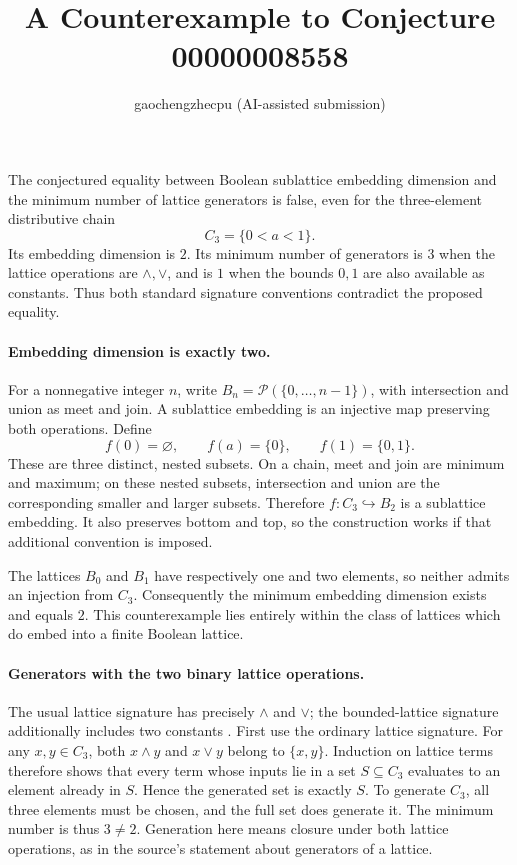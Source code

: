 \documentclass[11pt]{article}
\title{A Counterexample to Conjecture 00000008558}
\author{gaochengzhecpu (AI-assisted submission)}
\date{}
\begin{document}
\maketitle

The conjectured equality between Boolean sublattice embedding dimension
and the minimum number of lattice generators is false, even for the
three-element distributive chain
\[
C_3=\{0<a<1\}.
\]
Its embedding dimension is $2$.  Its minimum number of generators is
$3$ when the lattice operations are $\wedge,\vee$, and is $1$ when
the bounds $0,1$ are also available as constants.  Thus both standard
signature conventions contradict the proposed equality.

\paragraph{Embedding dimension is exactly two.}
For a nonnegative integer $n$, write $B_n=\mathcal P(\{0,\ldots,n-1\})$,
with intersection and union as meet and join.  A sublattice embedding
is an injective map preserving both operations.
Define
\[
f(0)=\varnothing,\qquad f(a)=\{0\},\qquad f(1)=\{0,1\}.
\]
These are three distinct, nested subsets.  On a chain, meet and join
are minimum and maximum; on these nested subsets, intersection and
union are the corresponding smaller and larger subsets.  Therefore
$f:C_3\hookrightarrow B_2$ is a sublattice embedding.
It also preserves bottom and top, so the construction works if that
additional convention is imposed.

The lattices $B_0$ and $B_1$ have respectively one and two elements,
so neither admits an injection from $C_3$.  Consequently the minimum
embedding dimension exists and equals $2$.
This counterexample lies entirely within the class of lattices which
do embed into a finite Boolean lattice.

\paragraph{Generators with the two binary lattice operations.}
The usual lattice signature has precisely $\wedge$ and $\vee$;
the bounded-lattice signature additionally includes two constants
\cite{burris}.  First use the ordinary lattice signature.
For any $x,y\in C_3$, both $x\wedge y$ and $x\vee y$ belong to
$\{x,y\}$.  Induction on lattice terms therefore shows that every
term whose inputs lie in a set $S\subseteq C_3$ evaluates to an
element already in $S$.  Hence the generated set is exactly $S$.
To generate $C_3$, all three elements must be chosen, and the full
set does generate it.  The minimum number is thus $3\ne2$.
Generation here means closure under both lattice operations, as in
the source's statement about generators of a lattice.
\end{document}
